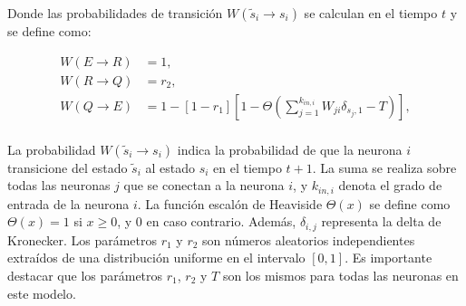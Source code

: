\begin{definitionT}
Donde las probabilidades de transición $W(\tilde{s}_i\to s_i)$ se calculan en el tiempo $t$ y se define como:

\begin{align}\label{eq:55}
	W(E\to R)&=1,\\
	W(R\to Q)&=r_2,\\
	W(Q\to E) &= 1-\left[1-r_1\right]\left[1-\Theta\left(\sum_{j=1}^{k_{in,i}}W_{ji}\delta_{s_j,1}-T\right)\right],\\
\end{align}

La probabilidad $W(\tilde{s}_i\to s_i)$  indica la probabilidad de que la neurona $i$ transicione del estado $\tilde{s}_i$ al estado $s_i$ en el tiempo $t + 1$. La suma se realiza sobre todas las neuronas $j$ que se conectan a la neurona $i$, y $k_{in,i}$ denota el grado de entrada de la neurona $i$.  La función escalón de Heaviside $\Theta(x)$ se define como  $\Theta(x)=1$ si $x \geq 0$, y $0$ en caso contrario. Además, $\delta_{i,j}$ representa la delta de Kronecker. Los parámetros $r_1$ y $r_2$ son números aleatorios independientes extraídos de una distribución uniforme en el intervalo $[0, 1]$. Es importante destacar que los parámetros $r_1$, $r_2$ y $T$ son los mismos para todas las neuronas en este modelo.
\end{definitionT}



